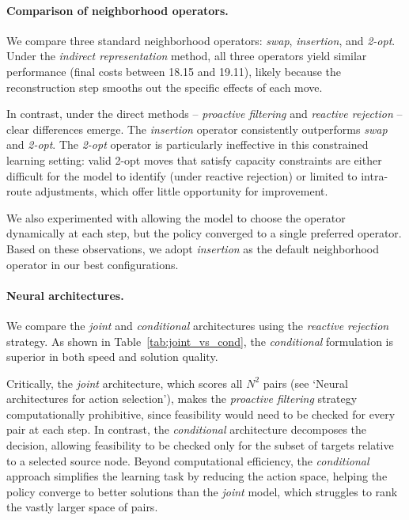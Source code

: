 \documentclass[letterpaper]{article} %
\begin{document}
\paragraph{Comparison of neighborhood operators.}



We compare three standard neighborhood operators: \textit{swap}, \textit{insertion}, and \textit{2-opt}. Under the \textit{indirect representation} method, all three operators yield similar performance (final costs between 18.15 and 19.11), likely because the reconstruction step smooths out the specific effects of each move.

In contrast, under the direct methods -- \textit{proactive filtering} and \textit{reactive rejection} -- clear differences emerge. The \textit{insertion} operator consistently outperforms \textit{swap} and \textit{2-opt}. The \textit{2-opt} operator is particularly ineffective in this constrained learning setting: valid 2-opt moves that satisfy capacity constraints are either difficult for the model to identify (under reactive rejection) or limited to intra-route adjustments, which offer little opportunity for improvement.

We also experimented with allowing the model to choose the operator dynamically at each step, but the policy converged to a single preferred operator. Based on these observations, we adopt \textit{insertion} as the default neighborhood operator in our best configurations.



\paragraph{Neural architectures.}
We compare the \textit{joint} and \textit{conditional} architectures using the \textit{reactive rejection} strategy. As shown in Table~\ref{tab:joint_vs_cond}, the \textit{conditional} formulation is superior in both speed and solution quality.

Critically, the \textit{joint} architecture, which scores all $N^2$ pairs (see `Neural architectures for action selection’), makes the \textit{proactive filtering} strategy computationally prohibitive, since feasibility would need to be checked for every pair at each step. In contrast, the \textit{conditional} architecture decomposes the decision, allowing feasibility to be checked only for the subset of targets relative to a selected source node.
Beyond computational efficiency, the \textit{conditional} approach simplifies the learning task by reducing the action space, helping the policy converge to better solutions than the \textit{joint} model, which struggles to rank the vastly larger space of pairs.
\end{document}
